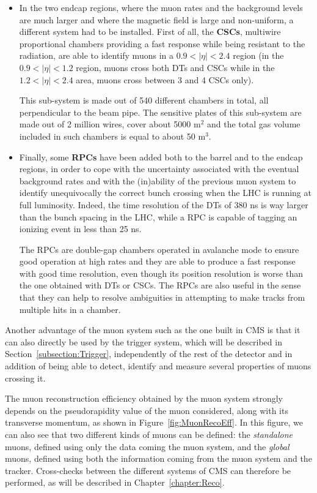 \documentclass[a4paper, 10pt, openright]{report}
\begin{document}
\begin{itemize}
\item In the two endcap regions, where the muon rates and the background levels are much larger and where the magnetic field is large and non-uniform, a different system had to be installed. First of all, the \textbf{\acfp{CSC}}, multiwire proportional chambers providing a fast response while being resistant to the radiation, are able to identify muons in a $0.9 < |\eta| < 2.4$ region (in the $0.9 < |\eta| < 1.2$ region, muons cross both \acp{DT} and \acp{CSC} while in the $1.2 < |\eta| < 2.4$ area, muons cross between 3 and 4 \acp{CSC} only). 

This sub-system is made out of 540 different chambers in total, all perpendicular to the beam pipe. The sensitive plates of this sub-system are made out of 2 million wires, cover about 5000 m$^2$ and the total gas volume included in such chambers is equal to about 50 m$^3$.

\item Finally, some \textbf{\acfp{RPC}} have been added both to the barrel and to the endcap regions, in order to cope with the uncertainty associated with the eventual background rates and with the (in)ability of the previous muon
system to identify unequivocally the correct bunch crossing when the \ac{LHC} is running at full luminosity. Indeed, the time resolution of the \acp{DT} of 380 ns is way larger than the bunch spacing in the \ac{LHC}, while a \ac{RPC} is capable
of tagging an ionizing event in less than 25 ns.

The \acp{RPC} are double-gap chambers operated in avalanche mode to ensure good operation at high rates and they are able to produce a fast response with good time resolution, even though its position resolution is worse than the one obtained with \acp{DT} or \acp{CSC}. The \acp{RPC} are also useful in the sense that they can help to resolve ambiguities in attempting to make tracks from multiple hits in a chamber. 
\end{itemize}

Another advantage of the muon system such as the one built in \ac{CMS} is that it can also directly be used by the trigger system, which will be described in Section~\ref{subsection:Trigger}, independently of the rest of the detector and in addition of being able to detect, identify and measure several properties of muons crossing it.

The muon reconstruction efficiency obtained by the muon system strongly depends on the pseudorapidity value of the muon considered, along with its transverse momentum, as shown in Figure~\ref{fig:MuonRecoEff}. In this figure, we can also see that two different kinds of muons can be defined: the \textit{standalone} muons, defined using only the data coming the muon system, and the \textit{global} muons, defined using both the information coming from the muon system and the tracker. Cross-checks between the different systems of \ac{CMS} can therefore be performed, as will be described in Chapter~\ref{chapter:Reco}.
\end{document}
